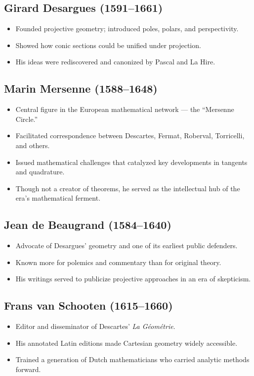 \documentclass[9pt]{article}
\begin{document}
\subsection*{Girard Desargues (1591–1661)}
\begin{itemize}
  \item Founded projective geometry; introduced poles, polars, and perspectivity.
  \item Showed how conic sections could be unified under projection.
  \item His ideas were rediscovered and canonized by Pascal and La Hire.
\end{itemize}

\subsection*{Marin Mersenne (1588–1648)}
\begin{itemize}
  \item Central figure in the European mathematical network — the “Mersenne Circle.”
  \item Facilitated correspondence between Descartes, Fermat, Roberval, Torricelli, and others.
  \item Issued mathematical challenges that catalyzed key developments in tangents and quadrature.
  \item Though not a creator of theorems, he served as the intellectual hub of the era’s mathematical ferment.
\end{itemize}

\subsection*{Jean de Beaugrand (1584–1640)}
\begin{itemize}
  \item Advocate of Desargues’ geometry and one of its earliest public defenders.
  \item Known more for polemics and commentary than for original theory.
  \item His writings served to publicize projective approaches in an era of skepticism.
\end{itemize}

\subsection*{Frans van Schooten (1615–1660)}
\begin{itemize}
  \item Editor and disseminator of Descartes’ \textit{La Géométrie}.
  \item His annotated Latin editions made Cartesian geometry widely accessible.
  \item Trained a generation of Dutch mathematicians who carried analytic methods forward.
\end{itemize}
\end{document}
